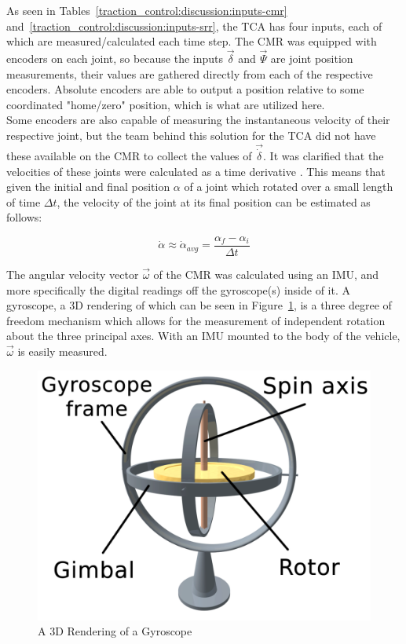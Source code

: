 As seen in Tables~\ref{traction_control:discussion:inputs-cmr} and~\ref{traction_control:discussion:inputs-srr}, the \ac{TCA} has four inputs, each of which are measured/calculated each time step. The \ac{CMR} was equipped with encoders on each joint, so because the inputs $\vec{\delta}$ and $\vec{\Psi}$ are joint position measurements, their values are gathered directly from each of the respective encoders. Absolute encoders are able to output a position relative to some coordinated "home/zero" position, which is what are utilized here. \\

Some encoders are also capable of measuring the instantaneous velocity of their respective joint, but the team behind this solution for the \ac{TCA} did not have these available on the \ac{CMR} to collect the values of $\vec{\dot{\delta}}$. It was clarified that the velocities of these joints were calculated as a time derivative \cite{tractl}. This means that given the initial and final position $\alpha$ of a joint which rotated over a small length of time $\Delta t$, the velocity of the joint at its final position can be estimated as follows:

\begin{equation}
\dot{\alpha} \approx \dot{\alpha}_{avg} = \frac{\alpha_{f} - \alpha_{i}}{\Delta t}
\end{equation}

The angular velocity vector $\vec{\omega}$ of the \ac{CMR} was calculated using an \ac{IMU}, and more specifically the digital readings off the gyroscope(s) inside of it. A gyroscope, a 3D rendering of which can be seen in Figure~\ref{traction_control:discussion:gyro}, is a three degree of freedom mechanism which allows for the measurement of independent rotation about the three principal axes. With an \ac{IMU} mounted to the body of the vehicle, $\vec{\omega}$ is easily measured.

\begin{figure}[htbp]
	\centering
	\includegraphics[width=.5\textwidth]{sections/discussion/images/gyroscope.png}
	\caption{A 3D Rendering of a Gyroscope}
	\label{traction_control:discussion:gyro}
\end{figure}

